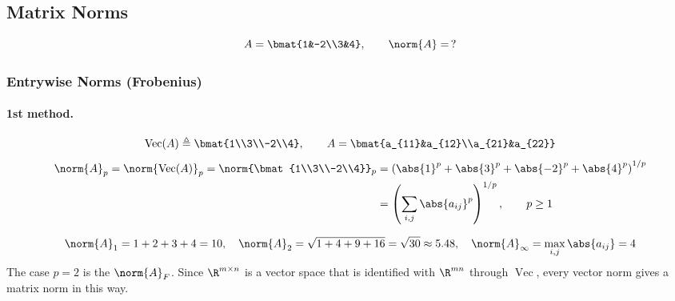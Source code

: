 \subsection{Matrix Norms}\label{ss:matrix-norms}
\[ A = \bmat{1&-2\\3&4}, \qquad \norm{A}=\,? \]

\subsubsection{Entrywise Norms (Frobenius)}
\paragraph{1st method.}
\[
\operatorname{Vec}(A) \triangleq \bmat{1\\3\\-2\\4}, \qquad A = \bmat{a_{11}&a_{12}\\a_{21}&a_{22}}
\]
\begin{align*}
\norm{A}_p = \norm{\operatorname{Vec}(A)}_p = \norm{\bmat{1\\3\\-2\\4}}_p &= \left(\abs{1}^p+\abs{3}^p+\abs{-2}^p+\abs{4}^p\right)^{1/p}\\
&= \left(\sum_{i,j}\abs{a_{ij}}^p\right)^{1/p}, \qquad p\ge1
\end{align*}
\begin{insight}
\[
\norm{A}_1 = 1+2+3+4 = 10, \quad
\norm{A}_2 = \sqrt{1+4+9+16}=\sqrt{30}\approx5.48, \quad
\norm{A}_\infty = \max_{i,j}\abs{a_{ij}} = 4
\]
The case $p=2$ is the  $\norm{A}_F$. Since $\R^{m\times n}$ is a vector space that is identified with $\R^{mn}$ through $\operatorname{Vec}$, every vector norm gives a matrix norm in this way.
\end{insight}
